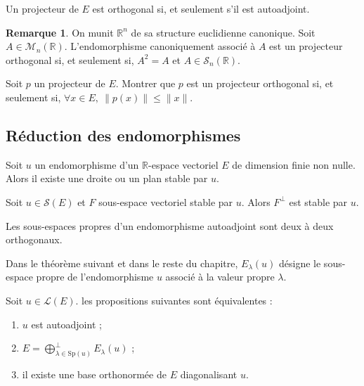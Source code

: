 \documentclass[french]{article}
\newcommand{\R}{\mathbb{R}}
\theoremstyle{plain}
\theoremstyle{definition}
\newtheorem*{rmq}{Remarque}
\theoremstyle{remark}
\begin{document}
\begin{prop}
	Un projecteur de $E$ est orthogonal si, et seulement s'il est autoadjoint.
\end{prop}

\begin{rmq}
	On munit $\R^n$ de sa structure euclidienne canonique. Soit $A\in\mathcal{M}_n(\R)$. L'endomorphisme canoniquement associé à $A$ est un projecteur orthogonal si, et seulement si, $A^2=A$ et $A\in\mathcal{S}_n(\R)$.
\end{rmq}

\begin{exo}
	Soit $p$ un projecteur de $E$. Montrer que $p$ est un projecteur orthogonal si, et seulement si, $\forall x\in E,\ \lVert p(x)\rVert\leqslant\lVert x\rVert$.
\end{exo}

\subsection{Réduction des endomorphismes}

\begin{lem}
	Soit $u$ un endomorphisme d'un $\R$-espace vectoriel $E$ de dimension finie non nulle. Alors il existe une droite ou un plan stable par $u$.
\end{lem}

\begin{prop}
	Soit $u\in\mathcal{S}(E)$ et $F$ sous-espace vectoriel stable par $u$. Alors $F^\bot$ est stable par $u$.
\end{prop}

\begin{lem}
	Les sous-espaces propres d'un endomorphisme autoadjoint sont deux à deux orthogonaux.
\end{lem}

Dans le théorème suivant et dans le reste du chapitre, $E_\lambda(u)$ désigne le sous-espace propre de l'endomorphisme $u$ associé à la valeur propre $\lambda$.

\begin{thm}
	Soit $u\in\mathcal{L}(E)$. les propositions suivantes sont équivalentes :
	\begin{enumerate}
		\item $u$ est autoadjoint ;
		\item $\displaystyle E=\bigoplus_{\lambda\in\text{Sp}(u)}^{\bot}E_\lambda(u)$ ;
		\item il existe une base orthonormée de $E$ diagonalisant $u$.
	\end{enumerate}
\end{thm}
\end{document}
